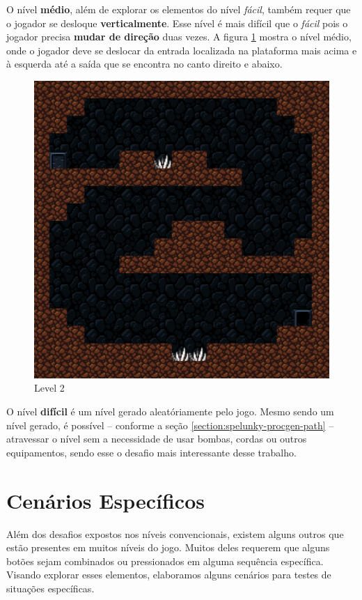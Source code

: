 O nível \textbf{médio}, além de explorar os elementos do nível \textit{fácil},
também requer que o jogador se desloque \textbf{verticalmente}. Esse nível é
mais difícil que o \textit{fácil} pois o jogador precisa \textbf{mudar de
direção} duas vezes. A figura \ref{fig:level2} mostra o nível médio, onde o
jogador deve se deslocar da entrada localizada na plataforma mais acima e à
esquerda até a saída que se encontra no canto direito e abaixo.

\begin{figure}[H]
\centering
\includegraphics[width=\textwidth / 2]{fig/levels/level2.pdf}
\caption{Level 2}
\label{fig:level2}
\end{figure}


O nível \textbf{difícil} é um nível gerado aleatóriamente pelo jogo. Mesmo
sendo um nível gerado, é possível -- conforme a seção
\ref{section:spelunky-procgen-path} -- atravessar o nível sem a necessidade de
usar bombas, cordas ou outros equipamentos, sendo esse o desafio mais
interessante desse trabalho.

\section{Cenários Específicos}

Além dos desafios expostos nos níveis convencionais, existem alguns outros que
estão presentes em muitos níveis do jogo. Muitos deles requerem que alguns
botões sejam combinados ou pressionados em alguma sequência específica. Visando
explorar esses elementos, elaboramos alguns cenários para testes de situações
específicas.

